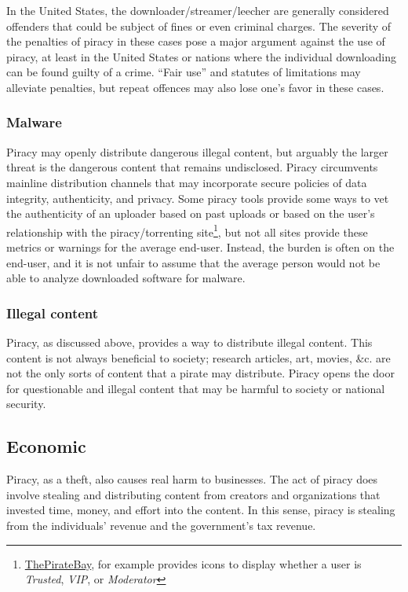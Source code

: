 \documentclass[onecolumn, 12pt]{article}
\begin{document}
In the United States, the downloader/streamer/leecher are generally considered
offenders that could be subject of fines or even criminal charges. The severity
of the penalties of piracy in these cases pose a major argument against the use
of piracy, at least in the United States or nations where the individual
downloading can be found guilty of a crime. ``Fair use'' and statutes of
limitations may alleviate penalties, but repeat offences may also lose one's
favor in these cases.~\cite{felonies.org}

\subsubsection{Malware}
Piracy may openly distribute dangerous illegal content, but arguably the
larger threat is the dangerous content that remains undisclosed. Piracy
circumvents mainline distribution channels that may incorporate secure policies
of data integrity, authenticity, and privacy. Some piracy tools provide
some ways to vet the authenticity of an uploader based on past uploads or based
on the user's relationship with the piracy/torrenting
site\footnote{%
  \href{https://pirates-forum.org/Thread-ThePirateBay-Want-Trusted-VIP-Status-Pink-Green-Skull-See-Here}{ThePirateBay},
  for example provides icons to display whether a user is \emph{Trusted},
  \emph{VIP}, or \emph{Moderator}%
}, but not all sites provide these metrics or warnings for the average end-user.
Instead, the burden is often on the end-user, and it is not unfair to assume
that the average person would not be able to analyze downloaded software for
malware.


\subsubsection{Illegal content}
Piracy, as discussed above, provides a way to distribute illegal content. This
content is not always beneficial to society; research articles, art, movies, \&c.
are not the only sorts of content that a pirate may distribute. Piracy opens
the door for questionable and illegal content that may be harmful to society
or national security.


\subsection{Economic}
Piracy, as a theft, also causes real harm to businesses. The act of piracy
does involve stealing and distributing content from creators and organizations
that invested time, money, and effort into the content. In this sense, piracy
is stealing from the individuals' revenue and the government's tax
revenue.~\cite{congress:pirating-the-american-dream}
\end{document}
